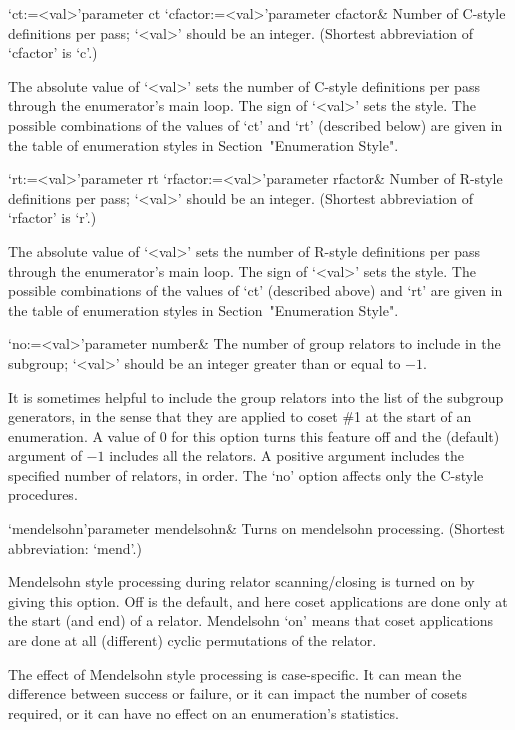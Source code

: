 \beginitems

\>`ct:=<val>'{parameter ct}
\>`cfactor:=<val>'{parameter cfactor}&
Number of C-style definitions per pass; `<val>' should be an  integer. 
(Shortest abbreviation of `cfactor' is `c'.)

The absolute value of `<val>' sets the
number of C-style definitions per  pass through  the enumerator's main
loop. The sign of `<val>'  sets the  style. The possible  combinations
of the values of `ct' and  `rt'  (described below)  are  given in  the
table of  enumeration styles in Section~"Enumeration Style".

\>`rt:=<val>'{parameter rt}
\>`rfactor:=<val>'{parameter rfactor}&
Number of R-style definitions per pass; `<val>' should be an  integer. 
(Shortest abbreviation of `rfactor' is `r'.)

The absolute value of `<val>' sets the
number of R-style definitions per  pass through  the enumerator's main
loop. The sign of `<val>'  sets the  style. The possible  combinations
of the values of `ct' (described above)  and  `rt'  are  given in  the
table of  enumeration styles in Section~"Enumeration Style".

\>`no:=<val>'{parameter  number}&
The number of group relators to include in the subgroup; `<val>' should
be an integer greater than or equal to $-1$.

It is sometimes helpful to  include the group relators  into the  list  
of the subgroup generators,  in  the sense that they  are  applied  to
coset \#1 at the start of an enumeration. A value of 0 for this option
turns this feature off and the (default) argument of $-1$ includes all
the relators. A  positive argument  includes the  specified  number of
relators, in order. The `no' option affects only the C-style procedures.

\>`mendelsohn'{parameter mendelsohn}&
Turns on mendelsohn processing. (Shortest abbreviation: `mend'.)

Mendelsohn style processing  during relator scanning/closing is turned
on  by  giving  this option.   Off  is  the  default, and  here  coset
applications  are done  only  at the  start  (and end)  of a  relator.
Mendelsohn \lq on' means that  coset  applications  are  done  at  all
(different)  cyclic permutations of  the relator.   

The effect  of Mendelsohn style  processing is case-specific.   It can
mean the difference  between success or failure, or  it can impact the
number  of  cosets   required,  or  it  can  have   no  effect  on  an
enumeration's statistics.

